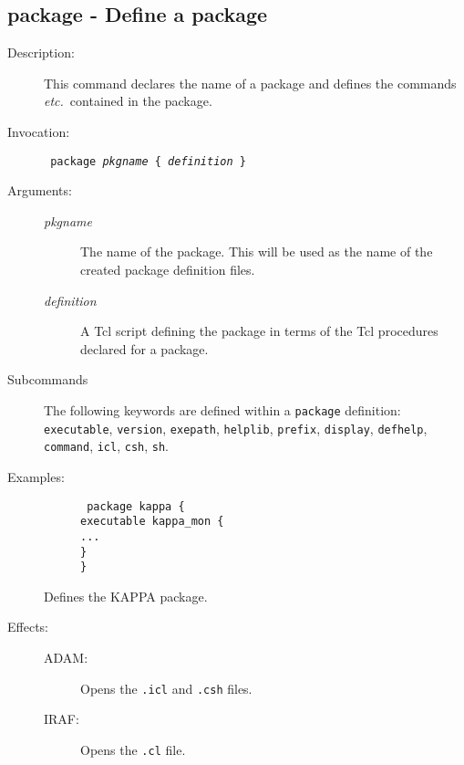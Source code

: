 \documentclass[twoside,11pt]{article}
\newcommand{\htmlref}[2]{#1}
\newcommand{\xlabel}[1]{}
\newcommand{\tab}{\>}
\renewcommand{\tab}{   }
\newlength{\sstbannerlength}
\newlength{\sstcaptionlength}
\newlength{\sstexampleslength}
\newlength{\sstexampleswidth}
\newcommand{\sstroutine}[3]{
   \goodbreak
   \rule{\textwidth}{0.5mm}
   \vspace{-7ex}
   \newline
   \settowidth{\sstbannerlength}{{\Large {\bf #1}}}
   \setlength{\sstcaptionlength}{\textwidth}
   \setlength{\sstexampleslength}{\textwidth}
   \addtolength{\sstbannerlength}{0.5em}
   \addtolength{\sstcaptionlength}{-2.0\sstbannerlength}
   \addtolength{\sstcaptionlength}{-5.0pt}
   \settowidth{\sstexampleswidth}{{\bf Examples:}}
   \addtolength{\sstexampleslength}{-\sstexampleswidth}
   \parbox[t]{\sstbannerlength}{\flushleft{\Large {\bf #1}}}
   \parbox[t]{\sstcaptionlength}{\center{\Large #2}}
   \parbox[t]{\sstbannerlength}{\flushright{\Large {\bf #1}}}
   \begin{description}
      #3
   \end{description}
}
\newcommand{\sstdescription}[1]{\item[Description:] #1}
\newcommand{\sstinvocation}[1]{\item[Invocation:]\hspace{0.4em}{\tt #1}}
\newcommand{\ssteffects}[1]{
   \item[Effects:] \mbox{} \\
   \vspace{-3.5ex}
   \begin{description}
      #1
   \end{description}
}
\newcommand{\sstarguments}[1]{
   \item[Arguments:] \mbox{} \\
   \vspace{-3.5ex}
   \begin{description}
      #1
   \end{description}
}
\newcommand{\sstexamples}[1]{
   \item[Examples:] \mbox{}
      #1
}
\newcommand{\sstsubsection}[1]{ \item[{#1}] \mbox{} \\}
\newcommand{\sstexamplesubsection}[2]
{   \vspace{-5ex}
\begin{quote} \texttt{\begin{tabbing}
xxx\=xxx\=\kill
#1
\end{tabbing}}
\end{quote}
#2}
\newcommand{\sstdiytopic}[2]{\item[{\hspace{-0.35em}#1\hspace{-0.35em}:}] \mbox{} \\[1.3ex] #2}
\newcommand{\ssttt}{\tt}
\renewcommand{\sstroutine}[3]{
      \subsection{#1\xlabel{#1}-\label{#1}#2}
      \begin{description}
         #3
      \end{description}
   }
\renewcommand{\sstdescription}[1]{\item[Description:]
      \begin{description}
         #1
      \end{description}
   }
\renewcommand{\sstinvocation}[1]{\item[Invocation:]
      \begin{description}
         {\ssttt #1}
      \end{description}
   }
\renewcommand{\ssteffects}[1]{
      \item[Effects:]
      \begin{description}
         #1
      \end{description}
   }
\renewcommand{\sstarguments}[1]{
      \item[Arguments:]
      \begin{description}
         #1
      \end{description}
   }
\renewcommand{\sstexamples}[1]{
      \item[Examples:]
      \begin{description}
         #1
      \end{description}
   }
\renewcommand{\sstsubsection}[1]{\item[{#1}]}
\renewcommand{\sstexamplesubsection}[2]{\item[] {\ssttt #1} \\ \item[#2]}
\renewcommand{\sstdiytopic}[2]{\item[{#1}]
      \begin{description}
         #2
      \end{description}
   }
\begin{document}
\sstroutine{
   package
}{
   Define a package
}{
   \sstdescription{
      This command declares the name of a package and defines the commands
      \textit{etc.}\ contained in the package.
   }
   \sstinvocation{
      package \textit{pkgname} \{ \textit{definition} \}
   }
   \sstarguments{
      \sstsubsection{
         \textit{pkgname}
      }{
         The name of the package. This will be used as the name of the created
         package definition files.
      }
      \sstsubsection{
         \textit{definition}
      }
         A Tcl script defining the package in terms of the Tcl procedures
         declared for a package.
   }
   \sstdiytopic{Subcommands}{
      The following keywords are defined within a \texttt{package} definition:
      \htmlref{{\ssttt executable}}{executable},
      \htmlref{{\ssttt version}}{version},
      \htmlref{{\ssttt exepath}}{exepath},
      \htmlref{{\ssttt helplib}}{helplib},
      \htmlref{{\ssttt prefix}}{prefix},
      \htmlref{{\ssttt display}}{display},
      \htmlref{{\ssttt defhelp}}{defhelp},
      \htmlref{{\ssttt command}}{command},
      \htmlref{{\ssttt icl}}{icl},
      \htmlref{{\ssttt csh}}{csh},
      \htmlref{{\ssttt sh}}{sh}.
   }
   \sstexamples{
      \sstexamplesubsection{
         package kappa \{\\
         \tab executable kappa\_mon \{\\
         \tab \tab ...\\
         \tab \}\\
         \}
      }{
         Defines the KAPPA package.
      }
   }
   \ssteffects{
      \sstsubsection{ADAM:}{Opens the {\ssttt .icl} and {\ssttt .csh} files.}
      \sstsubsection{IRAF:}{Opens the {\ssttt .cl} file.}
   }
}
\end{document}
